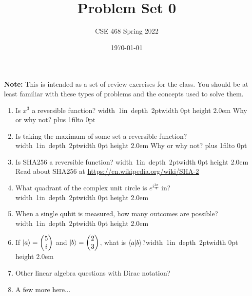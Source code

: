 \documentclass[12pt]{article}
\title{Problem Set 0}
\author{CSE 468 Spring 2022}
\date{\today}
\newcommand{\Blank}{\mbox{\vrule width 1in depth 2pt}\vrule width 0pt height 2.0em}
\def\DefaultSpace{1in}
\newcommand{\LeaveSpace}[1][\DefaultSpace]{%
\vskip #1 plus 1fil\relax\hbox to 0pt{\hss} %
}
\begin{document}
\maketitle

\noindent \textbf{Note:} This is intended as a set of review exercises for the class. You should be at least familiar with these types of problems and the concepts used to solve them.

\begin{enumerate}[font=\bfseries]
    \item Is $x^3$ a reversible function? \Blank{} Why or why not? \LeaveSpace[0.5in]
    \item Is taking the maximum of some set a reversible function? \Blank{} Why or why not?\LeaveSpace{}
    \item Is SHA256 a reversible function? \Blank{} Read about SHA256 at \href{https://en.wikipedia.org/wiki/SHA-2}{https://en.wikipedia.org/wiki/SHA-2} 
    \item What quadrant of the complex unit circle is $e^{i\frac{3\pi}{4}}$ in?\Blank{}
    \item When a single qubit is measured, how many outcomes are possible?\Blank{}
    \item If $\ket{a} = \begin{pmatrix}5 \\ i \end{pmatrix}$ and $\ket{b} = \begin{pmatrix}2 \\ 3 \end{pmatrix}$, what is $\braket{a|b}$?\Blank{}
    \item Other linear algebra questions with Dirac notation?
    \item A few more here...
    
\end{enumerate}
\end{document}

